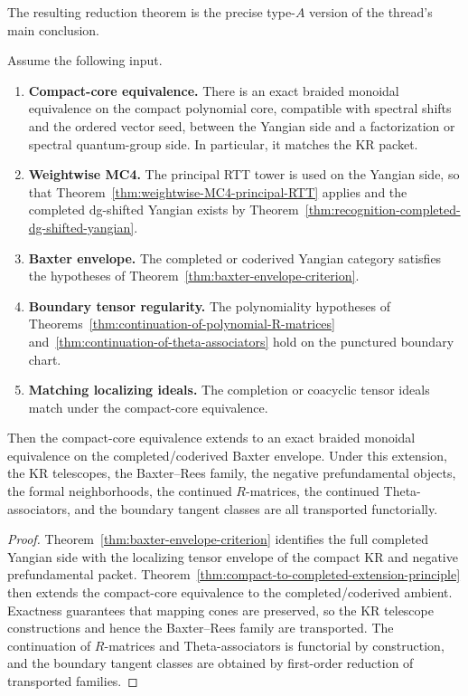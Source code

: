 The resulting reduction theorem is the precise type-$A$ version of the
thread's main conclusion.

\begin{theorem}
\ClaimStatusProvedHere
\label{thm:typeA-reduction-full-derived-DK-frontier}
Assume the following input.
\begin{enumerate}
    \item \textbf{Compact-core equivalence.}
    There is an exact braided monoidal equivalence on the compact
    polynomial core, compatible with spectral shifts and the ordered
    vector seed, between the Yangian side and a factorization or spectral
    quantum-group side.  In particular, it matches the KR packet.
    \item \textbf{Weightwise MC4.}
    The principal RTT tower is used on the Yangian side, so that
    Theorem~\ref{thm:weightwise-MC4-principal-RTT} applies and the
    completed dg-shifted Yangian exists by
    Theorem~\ref{thm:recognition-completed-dg-shifted-yangian}.
    \item \textbf{Baxter envelope.}
    The completed or coderived Yangian category satisfies the hypotheses
    of Theorem~\ref{thm:baxter-envelope-criterion}.
    \item \textbf{Boundary tensor regularity.}
    The polynomiality hypotheses of
    Theorems~\ref{thm:continuation-of-polynomial-R-matrices}
    and~\ref{thm:continuation-of-theta-associators} hold on the punctured
    boundary chart.
    \item \textbf{Matching localizing ideals.}
    The completion or coacyclic tensor ideals match under the compact-core
    equivalence.
\end{enumerate}
Then the compact-core equivalence extends to an exact braided monoidal
equivalence on the completed/coderived Baxter envelope.  Under this
extension, the KR telescopes, the Baxter--Rees family, the negative
prefundamental objects, the formal neighborhoods, the continued
$R$-matrices, the continued Theta-associators, and the boundary tangent
classes are all transported functorially.
\end{theorem}

\begin{proof}
Theorem~\ref{thm:baxter-envelope-criterion} identifies the full completed
Yangian side with the localizing tensor envelope of the compact KR and
negative prefundamental packet.  Theorem~\ref{thm:compact-to-completed-extension-principle}
then extends the compact-core equivalence to the completed/coderived
ambient.  Exactness guarantees that mapping cones are preserved, so the KR
telescope constructions and hence the Baxter--Rees family are transported.
The continuation of $R$-matrices and Theta-associators is functorial by
construction, and the boundary tangent classes are obtained by first-order
reduction of transported families.
\end{proof}

